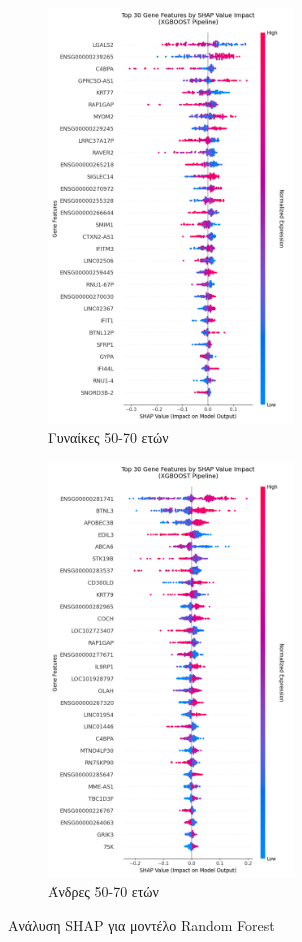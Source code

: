 \documentclass[12pt]{report}
\begin{document}
            \begin{figure}[H]
                \centering
                \begin{subfigure}[b]{0.45\textwidth}
                    \centering
                    \includegraphics[height=11cm,width=\textwidth,keepaspectratio]{ML/Predict/DEG/SHAP/XGBoost/shap_beeswarm_plot_Female_50-70_useSMOTE_False.png}
                    \caption{Γυναίκες 50-70 ετών}
                    \label{fig:shap_beeswarm_XGB_plot_Female_50-70_useSMOTE_False}
                \end{subfigure}
                \hfill
                \begin{subfigure}[b]{0.45\textwidth}
                    \centering
                    \includegraphics[height=11cm,width=\textwidth,keepaspectratio]{ML/Predict/DEG/SHAP/XGBoost/shap_beeswarm_plot_Male_50-70_useSMOTE_False.png}
                    \caption{Άνδρες 50-70 ετών}
                    \label{fig:shap_beeswarm_XGB_plot_Male_50-70_useSMOTE_False}
                \end{subfigure}
                \caption{Ανάλυση SHAP για μοντέλο Random Forest}
                \label{fig:beeswarm-shap-50-70-xgb-classifier}
            \end{figure}
\end{document}
